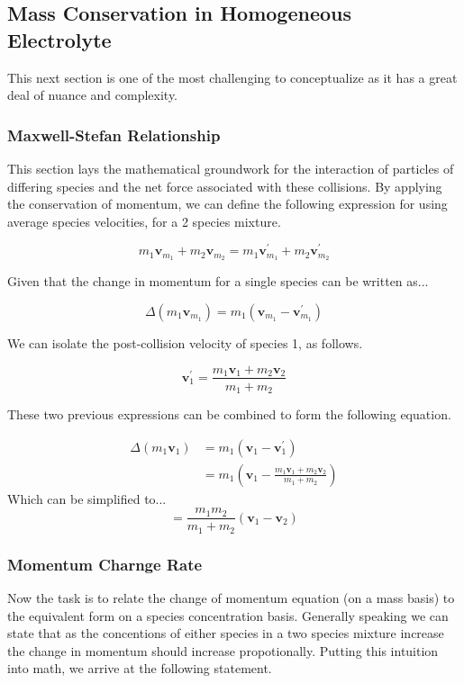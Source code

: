 \documentclass[lettersize,journal]{IEEEtran}
\begin{document}
\subsection{Mass Conservation in Homogeneous Electrolyte}



This next section is one of the most challenging to conceptualize as it has a great deal of nuance and complexity. \\

\subsubsection{Maxwell-Stefan Relationship}
This section lays the mathematical groundwork for the interaction of particles of differing species and the net force associated with these collisions. By applying the conservation of momentum, we can define the following expression for using average species velocities, for a 2 species mixture.

\[
m_{1} \mathbf{v}_{m_{1}}+m_{2} \mathbf{v}_{m_{2}}=m_{1} \mathbf{v}_{m_{1}}^{\prime}+m_{2} \mathbf{v}_{m_{2}}^{\prime}
\]

Given that the change in momentum for a single species can be written as...

\[
\Delta\left(m_{1} \mathbf{v}_{m_{1}}\right)=m_{1}\left(\mathbf{v}_{m_{1}}-\mathbf{v}_{m_{1}}^{\prime}\right)
\]



We can isolate the post-collision velocity of species 1, as follows.


\[
\mathbf{v}_{1}^{\prime}=\frac{m_{1} \mathbf{v}_{1}+m_{2} \mathbf{v}_{2}}{m_{1}+m_{2}}
\]

These two previous expressions can be combined to form the following equation.

\[
\begin{aligned}
\Delta\left(m_{1} \mathbf{v}_{1}\right) &=m_{1}\left(\mathbf{v}_{1}-\mathbf{v}_{1}^{\prime}\right) \\
&=m_{1}\left(\mathbf{v}_{1}-\frac{m_{1} \mathbf{v}_{1}+m_{2} \mathbf{v}_{2}}{m_{1}+m_{2}}\right)
\end{aligned}
\]
Which can be simplified to...
\[
=\frac{m_{1} m_{2}}{m_{1}+m_{2}}\left(\mathbf{v}_{1}-\mathbf{v}_{2}\right)
\]


\subsubsection{Momentum Charnge Rate}
Now the task is to relate the change of momentum equation (on a mass basis) to the equivalent form on a species concentration basis. Generally speaking we can state that as the concentions of either species in a two species mixture increase the change in momentum should increase propotionally. Putting this intuition into math, we arrive at the following statement.
\end{document}
